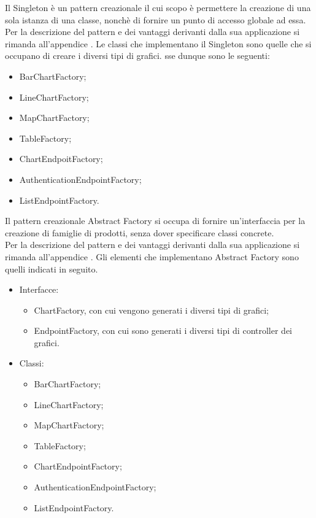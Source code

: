 				Il Singleton è un pattern creazionale il cui scopo è permettere la creazione di una sola istanza di una classe, nonchè di fornire un punto di accesso globale ad essa.\\
				Per la descrizione del pattern e dei vantaggi derivanti dalla sua applicazione si rimanda all'appendice .
					Le classi che implementano il Singleton sono quelle che si occupano di creare i diversi tipi di grafici. sse dunque sono le seguenti:
					\begin{itemize}
						\item BarChartFactory;
						\item LineChartFactory;
						\item MapChartFactory;
						\item TableFactory;
						\item ChartEndpoitFactory;
						\item AuthenticationEndpointFactory;
						\item ListEndpointFactory.
					\end{itemize}
				Il pattern creazionale Abstract Factory si occupa di fornire un'interfaccia per la creazione di famiglie di prodotti, senza dover specificare classi concrete.\\
				Per la descrizione del pattern e dei vantaggi derivanti dalla sua applicazione si rimanda all'appendice .
					Gli elementi che implementano Abstract Factory sono quelli indicati in seguito.
					\begin{itemize}
					\item Interfacce:
						\begin{itemize}
							\item ChartFactory, con cui vengono generati i diversi tipi di grafici;
							\item EndpointFactory, con cui sono generati i diversi tipi di controller dei grafici.
						\end{itemize}
					\item Classi:
						\begin{itemize}
							\item BarChartFactory;
							\item LineChartFactory;
							\item MapChartFactory;
							\item TableFactory;
							\item ChartEndpointFactory;
							\item AuthenticationEndpointFactory;
							\item ListEndpointFactory.
						\end{itemize}
					\end{itemize}
					
